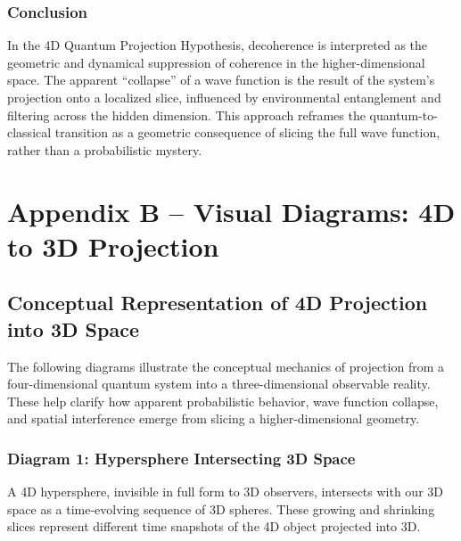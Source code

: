 \documentclass[12pt]{article}
\begin{document}
\subsubsection*{Conclusion}

In the 4D Quantum Projection Hypothesis, decoherence is interpreted as the geometric and dynamical suppression of coherence in the higher-dimensional space. The apparent “collapse” of a wave function is the result of the system's projection onto a localized slice, influenced by environmental entanglement and filtering across the hidden dimension. This approach reframes the quantum-to-classical transition as a geometric consequence of slicing the full wave function, rather than a probabilistic mystery.

\newpage

\section{Appendix B – Visual Diagrams: 4D to 3D Projection}

\subsection{Conceptual Representation of 4D Projection into 3D Space}

The following diagrams illustrate the conceptual mechanics of projection from a four-dimensional quantum system into a three-dimensional observable reality. These help clarify how apparent probabilistic behavior, wave function collapse, and spatial interference emerge from slicing a higher-dimensional geometry.

\subsubsection*{Diagram 1: Hypersphere Intersecting 3D Space}

A 4D hypersphere, invisible in full form to 3D observers, intersects with our 3D space as a time-evolving sequence of 3D spheres. These growing and shrinking slices represent different time snapshots of the 4D object projected into 3D.
\end{document}

